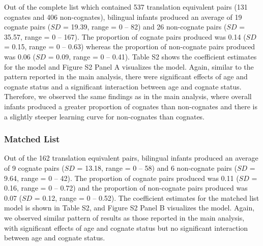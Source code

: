 \documentclass[
  ,man,floatsintext]{apa6}
\begin{document}
Out of the complete list which contained 537 translation equivalent pairs (131 cognates and 406 non-cognates), bilingual infants produced an average of 19 cognate pairs (\(SD\) = 19.39, range = 0 -- 82) and 26 non-cognate pairs (\(SD\) = 35.57, range = 0 -- 167). The proportion of cognate pairs produced was 0.14 (\(SD\) = 0.15, range = 0 -- 0.63) whereas the proportion of non-cognate pairs produced was 0.06 (\(SD\) = 0.09, range = 0 -- 0.41). Table S2 shows the coefficient estimates for the model and Figure S2 Panel A visualizes the model. Again, similar to the pattern reported in the main analysis, there were significant effects of age and cognate status and a significant interaction between age and cognate status. Therefore, we observed the same findings as in the main analysis, where overall infants produced a greater proportion of cognates than non-cognates and there is a slightly steeper learning curve for non-cognates than cognates.

\hypertarget{matched-list-1}{%
\subsubsection{Matched List}\label{matched-list-1}}

Out of the 162 translation equivalent pairs, bilingual infants produced an average of 9 cognate pairs (\(SD\) = 13.18, range = 0 -- 58) and 6 non-cognate pairs (\(SD\) = 9.64, range = 0 -- 42). The proportion of cognate pairs produced was 0.11 (\(SD\) = 0.16, range = 0 -- 0.72) and the proportion of non-cognate pairs produced was 0.07 (\(SD\) = 0.12, range = 0 -- 0.52). The coefficient estimates for the matched list model is shown in Table S2, and Figure S2 Panel B visualizes the model. Again, we observed similar pattern of results as those reported in the main analysis, with significant effects of age and cognate status but no significant interaction between age and cognate status.
\end{document}

